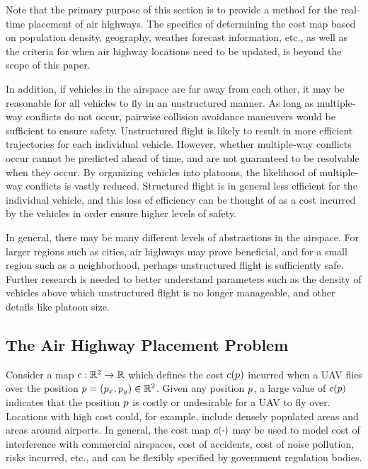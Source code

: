 Note that the primary purpose of this section is to provide a method for the real-time placement of air highways. The specifics of determining the cost map based on population density, geography, weather forecast information, etc., as well as the criteria for when air highway locations need to be updated, is beyond the scope of this paper.

In addition, if vehicles in the airspace are far away from each other, it may be reasonable for all vehicles to fly in an unstructured manner. As long as multiple-way conflicts do not occur, pairwise collision avoidance maneuvers would be sufficient to ensure safety. Unstructured flight is likely to result in more efficient trajectories for each individual vehicle. However, whether multiple-way conflicts occur cannot be predicted ahead of time, and are not guaranteed to be resolvable when they occur. By organizing vehicles into platoons, the likelihood of multiple-way conflicts is vastly reduced. Structured flight is in general less efficient for the individual vehicle, and this loss of efficiency can be thought of as a cost incurred by the vehicles in order ensure higher levels of safety.

In general, there may be many different levels of abstractions in the airspace. For larger regions such as cities, air highways may prove beneficial, and for a small region such as a neighborhood, perhaps unstructured flight is sufficiently safe. Further research is needed to better understand parameters such as the density of vehicles above which unstructured flight is no longer manageable, and other details like platoon size.

\subsection{The Air Highway Placement Problem}
Consider a map $c:\mathbb{R}^2 \rightarrow \mathbb{R}$ which defines the cost $c(p)$ incurred when a UAV flies over the position $p=(p_x,p_y)\in\mathbb{R}^2$. Given any position $p$, a large value of $c(p)$ indicates that the position $p$ is costly or undesirable for a UAV to fly over. Locations with high cost could, for example, include densely populated areas and areas around airports. In general, the cost map $c(\cdot)$ may be used to model cost of interference with commercial airspaces, cost of accidents, cost of noise pollution, risks incurred, etc., and can be flexibly specified by government regulation bodies. 

